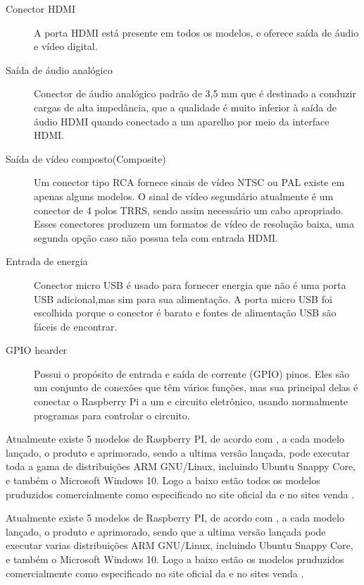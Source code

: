 \documentclass[
	12pt,				%
	openright,			%
	twoside,			%
	a4paper,			%
	chapter=TITLE,		%
	english,			%
	brazil				%
	]{abntex2}
\begin{document}
\begin{description}
\item[Conector HDMI] 
A porta HDMI está presente em todos os modelos, e oferece saída de áudio e vídeo digital.

\item[Saída de áudio analógico]
Conector de áudio analógico padrão de 3,5 mm que é destinado a conduzir cargas de alta impedância, que a qualidade é muito inferior à saída de áudio HDMI quando conectado a um aparelho por meio da interface HDMI.

\item[Saída de vídeo composto(Composite)]
Um conector tipo RCA fornece sinais de vídeo NTSC ou PAL existe em apenas alguns modelos. O sinal de vídeo segundário atualmente é um conector de 4 polos TRRS, sendo assim necessário um cabo apropriado. Esses conectores produzem um formatos de vídeo de resolução baixa, uma segunda opção caso não possua tela com entrada HDMI.

\item[Entrada de energia] 
Conector micro USB é usado para fornecer energia que não é uma porta USB adicional,mas sim para sua alimentação. A porta micro USB foi escolhida porque o conector é barato e fontes de alimentação USB são fáceis de encontrar.

\item[GPIO hearder]
Possui o propósito de entrada e saída de corrente (GPIO) pinos. Eles são um conjunto de conexões que têm vários funções, mas sua principal delas é conectar o Raspberry Pi a um e circuito eletrônico, usando normalmente programas para controlar o circuito.

\end{description}

Atualmente existe 5 modelos de Raspberry PI, de acordo com , a cada modelo lançado, o produto e aprimorado, sendo a ultima versão lançada, pode executar toda a gama de distribuições ARM GNU/Linux, incluindo Ubuntu Snappy Core, e também o  Microsoft Windows 10. Logo a baixo estão todos os modelos pruduzidos comercialmente como especificado no site oficial da  e no sites venda .


Atualmente existe 5 modelos de Raspberry PI, de acordo com , a cada modelo lançado, o produto e aprimorado, sendo que a ultima versão lançada pode executar varias distribuições ARM GNU/Linux, incluindo Ubuntu Snappy Core, e também o  Microsoft Windows 10. Logo a baixo estão os modelos pruduzidos comercialmente como especificado no site oficial da  e no sites venda .
\end{document}
